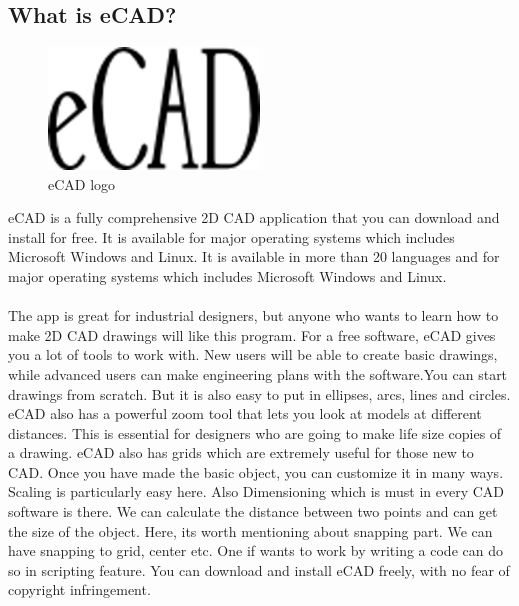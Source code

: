 \subsection{What is eCAD?}
\begin{figure}[h!]
\centering
\includegraphics[width=0.5\textwidth]{images/logo.png}
\caption{eCAD logo}
\end{figure}
eCAD is a fully comprehensive 2D CAD application that you can download and install for free. It is available for major operating systems which includes Microsoft Windows and Linux. It is available in more than 20 languages and for major operating systems which includes Microsoft Windows and Linux.\\\\
The app is great for industrial designers, but anyone who wants to learn how to make 2D
CAD drawings will like this program. For a free software, eCAD gives you a lot of tools
to work with. New users will be able to create basic drawings, while advanced users can
make engineering plans with the software.You can start drawings from scratch. But it is
also easy to put in ellipses, arcs, lines and circles. eCAD also has a powerful zoom tool
that lets you look at models at diﬀerent distances. This is essential for designers who
are going to make life size copies of a drawing. eCAD also has grids which are extremely
useful for those new to CAD. Once you have made the basic object, you can customize
it in many ways. Scaling is particularly easy here. Also Dimensioning which is must in
every CAD software is there. We can calculate the distance between two points and can
get the size of the object. Here, its worth mentioning about snapping part. We can have
snapping to grid, center etc. One if wants to work by writing a code can do so in scripting
feature. You can download and install eCAD freely, with no fear of copyright infringement.\\\\

